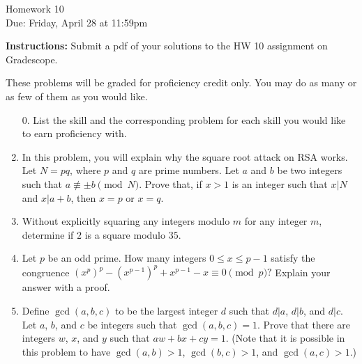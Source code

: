 \documentclass[12pt]{article}
\begin{document}
\begin{center}
{\Large Homework 10}\\
Due: Friday,  April 28 at 11:59pm\\


\end{center}
{\bf Instructions:} Submit a pdf of your solutions to the HW 10 assignment on Gradescope.  

{ These problems will be graded for proficiency credit only.  You may do as many or as few of them as you would like.}



\begin{enumerate}
\item[0.] List the skill and the corresponding problem for each skill you would like to earn proficiency with. 

\item In this problem, you will explain why the square root attack on RSA works. Let $N=pq$, where $p$ and $q$ are prime numbers.  Let $a$ and $b$ be two integers such that $a\not\equiv \pm b\pmod{N}$.  Prove that, if $x>1$ is an integer such that $x|N$ and $x|a+b$, then $x=p$ or $x=q$. 

\item Without explicitly squaring any integers modulo $m$ for any integer $m$, determine if $2$ is a square modulo $35$. 

\item Let $p$ be an odd prime. How many integers $0\le x \le p-1$ satisfy the congruence $(x^p)^p-(x^{p-1})^p+x^{p-1}-x\equiv 0\pmod{p}?$ Explain your answer with a proof. 

\item Define $\gcd(a,b,c)$ to be the largest integer $d$ such that $d|a$, $d|b$, and $d|c$.  Let $a$, $b$, and $c$ be integers such that $\gcd(a,b,c)=1$. Prove that there are integers $w$, $x$, and $y$ such that $aw+bx+cy=1$.  (Note that it is possible in this problem to have $\gcd(a,b)>1$, $\gcd(b,c)>1$, and $\gcd(a,c)>1$.)

\end{enumerate}
\end{document}
